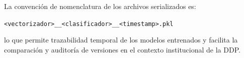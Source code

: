 La convención de nomenclatura de los archivos serializados es:

\begin{center}
  \texttt{<vectorizador>\_\_<clasificador>\_\_<timestamp>.pkl}
\end{center}

lo que permite trazabilidad temporal de los modelos entrenados y facilita la
comparación y auditoría de versiones en el contexto institucional de la DDP.

